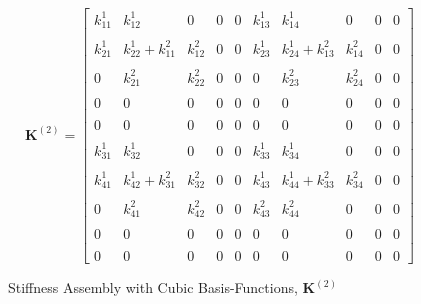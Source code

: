 \begin{figure}
	\centering
	\begin{equation*}
		\mathbf{K}^{\left( 2 \right)} =
		\begin{bmatrix}
			k_{11}^{1} & k_{12}^{1} & 0 & 0	& 0 & k_{13}^{1} & k_{14}^{1} & 0 & 0 & 0 \\ \\
			k_{21}^{1}&k_{22}^{1}+k_{11}^{2}&k_{12}^{2}&0 & 0 & k_{23}^{1} & k_{24}^{1}+k_{13}^{2} & k_{14}^{2} & 0 & 0 \\ \\
			0 & k_{21}^{2} & k_{22}^{2} & 0 & 0 & 0 & k_{23}^{2} & k_{24}^{2} & 0 & 0 \\ \\
			0 & 0 & 0 & 0 & 0 & 0 & 0 & 0 & 0 & 0 \\ \\
			0 & 0 & 0 & 0 & 0 & 0 & 0 & 0 & 0 & 0 \\ \\
			k_{31}^{1} & k_{32}^{1} & 0 & 0 & 0 & k_{33}^{1} & k_{34}^{1} & 0 & 0 & 0 \\ \\
			k_{41}^{1}&k_{42}^{1}+k_{31}^{2}&k_{32}^{2}&0& 0 & k_{43}^{1} & k_{44}^{1}+k_{33}^{2} & k_{34}^{2} & 0 & 0 \\ \\
			0 & k_{41}^{2} & k_{42}^{2} & 0 & 0	& k_{43}^{2} & k_{44}^{2} & 0 & 0 & 0 \\ \\
			0 & 0 & 0 & 0 & 0 & 0 & 0 & 0 & 0 & 0 \\ \\
			0 & 0 & 0 & 0 & 0 & 0 & 0 & 0 & 0 & 0
		\end{bmatrix}
	\end{equation*}
	\caption{Stiffness Assembly with Cubic Basis-Functions, $\mathbf{K}^{\left( 2 \right)}$}
	\label{fig:K_2_Cubic}
\end{figure}
%

